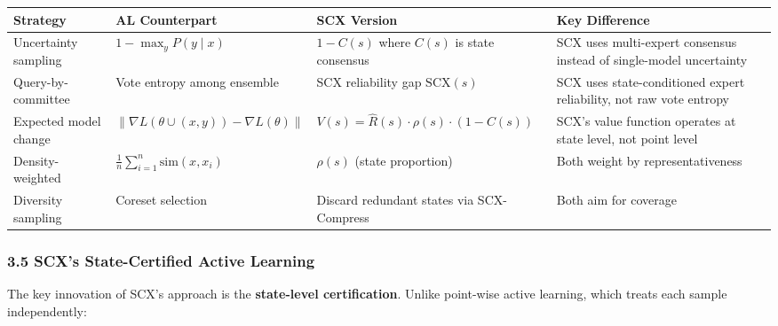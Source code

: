 \documentclass[
  12pt,
]{ctexart}
\begin{document}
\begin{longtable}[]{@{}
  >{\raggedright\arraybackslash}p{}
  >{\raggedright\arraybackslash}p{}
  >{\raggedright\arraybackslash}p{}
  >{\raggedright\arraybackslash}p{}@{}}
\toprule\noalign{}
\begin{minipage}[b]{\linewidth}\raggedright
Strategy
\end{minipage} & \begin{minipage}[b]{\linewidth}\raggedright
AL Counterpart
\end{minipage} & \begin{minipage}[b]{\linewidth}\raggedright
SCX Version
\end{minipage} & \begin{minipage}[b]{\linewidth}\raggedright
Key Difference
\end{minipage} \\
\midrule\noalign{}
\endhead
\bottomrule\noalign{}
\endlastfoot
Uncertainty sampling & \(1 - \max_y P(y \mid x)\) & \(1 - C(s)\) where
\(C(s)\) is state consensus & SCX uses multi-expert consensus instead of
single-model uncertainty \\
Query-by-committee & Vote entropy among ensemble & SCX reliability gap
\(\text{SCX}(s)\) & SCX uses state-conditioned expert reliability, not
raw vote entropy \\
Expected model change &
\(\|\nabla L(\theta \cup (x,y)) - \nabla L(\theta)\|\) &
\(V(s) = \hat{R}(s) \cdot \rho(s) \cdot (1 - C(s))\) & SCX's value
function operates at state level, not point level \\
Density-weighted & \(\frac{1}{n}\sum_{i=1}^n \text{sim}(x, x_i)\) &
\(\rho(s)\) (state proportion) & Both weight by representativeness \\
Diversity sampling & Coreset selection & Discard redundant states via
SCX-Compress & Both aim for coverage \\
\end{longtable}

\subsubsection{3.5 SCX's State-Certified Active
Learning}\label{scxs-state-certified-active-learning}

The key innovation of SCX's approach is the \textbf{state-level
certification}. Unlike point-wise active learning, which treats each
sample independently:
\end{document}
